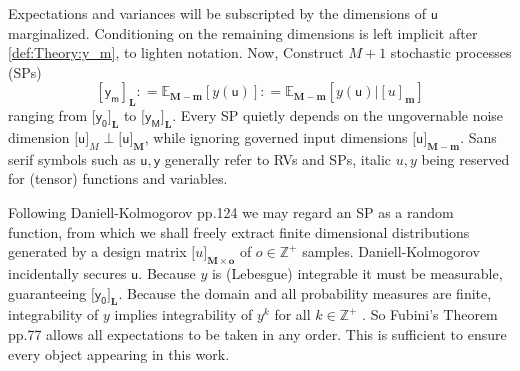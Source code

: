 \documentclass[preprint,12pt]{elsarticle}
\newcommand*{\M}[1]{\ensuremath{#1}\xspace}
\newcommand*{\x}{\times}
\newcommand*{\mi}[1]{\mathbf{#1}}
\newcommand*{\st}[1]{\mathbb{#1}}
\newcommand*{\rv}[1]{\mathsf{#1}}
\newcommand*{\te}[2][]{\left\lbrack{#2}\right\rbrack_{#1}}
\newcommand*{\tte}[2][]{\lbrack{#2}\rbrack_{#1}}
\newcommand*{\deq}{\M{\mathrel{\mathop:}=}}
\newcommand*{\ev}[3][]{\mathbb{E}_{#3}^{#1}\!\left\lbrack{#2}\right\rbrack}
\begin{document}
    Expectations and variances will be subscripted by the dimensions of $\rv{u}$ marginalized. Conditioning on the remaining dimensions is left implicit after \cref{def:Theory:y_m}, to lighten notation.
    Now, Construct $M+1$ stochastic processes (SPs)
    \begin{equation}\label{def:Theory:y_m}
        \te[\mi{L}]{\rv{y_m}} \deq \ev{y(\rv{u})}{\mi{M-m}} \deq \ev{y(\rv{u}) \big\vert \te[\mi{m}]{u}}{\mi{M-m}}
    \end{equation}
    ranging from $\tte[\mi{L}]{\rv{y_0}}$ to $\tte[\mi{L}]{\rv{y_M}}$. Every SP quietly depends on the ungovernable noise dimension $\tte[M]{\rv{u}} \perp \tte[\mi{M}]{\rv{u}}$, while ignoring governed input dimensions $\tte[\mi{M-m}]{\rv{u}}$. 
    Sans serif symbols such as $\rv{u,y}$ generally refer to RVs and SPs, italic $u,y$ being reserved for (tensor) functions and variables.
    
    Following Daniell-Kolmogorov \cite{Rogers.Williams2000} pp.124 we may regard an SP as a random function, from which we shall freely extract finite dimensional distributions generated by a design matrix $\tte[\mi{M\x o}]{u}$ of $o \in \st{Z}^{+}$ samples.
    Daniell-Kolmogorov incidentally secures $\rv{u}$. 
    Because $y$ is (Lebesgue) integrable it must be measurable, guaranteeing $\tte[\mi{L}]{\rv{y_0}}$.
    Because the domain and all probability measures are finite, integrability of $y$ implies integrability of $y^k$ for all $k \in \st{Z}^{+}$ \cite{Villani1985}. 
    So Fubini's Theorem \cite{Williams1991} pp.77 allows all expectations to be taken in any order. 
    This is sufficient to ensure every object appearing in this work.
\end{document}
